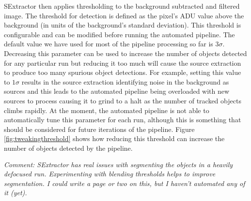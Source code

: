 SExtractor then applies thresholding to the background subtracted and filtered image. The threshold for detection is defined as the pixel's ADU value above the background (in units of the background's standard deviation). This threshold is configurable and can be modified before running the automated pipeline. The default value we have used for most of the pipeline processing so far is $3\sigma$. Decreasing this parameter can be used to increase the number of objects detected for any particular run but reducing it too much will cause the source extraction to produce too many spurious object detections. For example, setting this value to $1\sigma$ results in the source extraction identifying noise in the background as sources and this leads to the automated pipeline being overloaded with new sources to process causing it to grind to a halt as the number of tracked objects climbs rapidly. At the moment, the automated pipeline is not able to automatically tune this parameter for each run, although this is something that should be considered for future iterations of the pipeline. Figure \ref{fig:tweakingthreshold} shows how reducing this threshold can increase the number of objects detected by the pipeline.

\emph{Comment: SExtractor has real issues with segmenting the objects in a heavily defocused run. Experimenting with blending thresholds helps to improve segmentation. I could write a page or two on this, but I haven't automated any of it (yet). }

